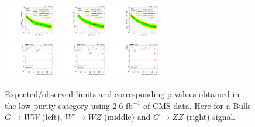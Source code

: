 \begin{figure}[h!]
\centering
\includegraphics[width=0.20\textwidth]{figures/analysis/search1/AN-15-211/limits/brazilianFlag_BulkWW_VVLP_new_combined_purity_13TeV_wPDF.pdf}
\includegraphics[width=0.20\textwidth]{figures/analysis/search1/AN-15-211/limits/brazilianFlag_WZ_VVLP_new_combined_purity_13TeV_wPDF.pdf}
\includegraphics[width=0.20\textwidth]{figures/analysis/search1/AN-15-211/limits/brazilianFlag_BulkZZ_VVLP_new_combined_purity_13TeV_wPDF.pdf}\\
\includegraphics[width=0.20\textwidth]{figures/analysis/search1/AN-15-211/pvalues/pvalue_BulkWWinVVnew_low_purity.pdf}
\includegraphics[width=0.20\textwidth]{figures/analysis/search1/AN-15-211/pvalues/pvalue_WZinVVnew_low_purity.pdf}
\includegraphics[width=0.20\textwidth]{figures/analysis/search1/AN-15-211/pvalues/pvalue_BulkZZinVVnew_low_purity.pdf}
\caption{Expected/observed limits and corresponding p-values obtained in the low purity category using 2.6 $\textrm{fb}^{-1}$ of CMS data. Here for a Bulk $G\rightarrow WW$ (left), $W'\rightarrow WZ$ (middle) and $G\rightarrow ZZ$ (right) signal.}
\label{fig:app:Limits_LP}
\end{figure}

